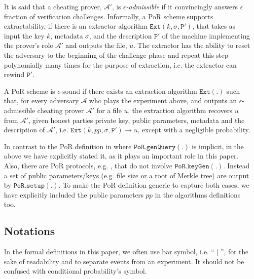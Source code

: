 It is said that a cheating prover, $\mathcal{A}'$, is \emph{$\epsilon$-admissible} if it convincingly answers $\epsilon$ fraction of verification challenges. Informally, a PoR scheme supports extractability, if there is an extractor algorithm $\mathtt{Ext}(k,\sigma, \mathtt{P}')$, that takes as input the key $k$, metadata $\sigma$, and the description $\mathtt{P}'$ of the  machine implementing the prover's role $\mathcal{A}'$ and outputs the file, $u$. The extractor has the ability to reset the adversary to the beginning of the challenge phase and repeat this step polynomially many times for the purpose of extraction, i.e. the extractor can rewind $\mathtt{P}'$.




\begin{definition}\label{extractable} A PoR scheme is $\epsilon$-sound if   there exists an extraction algorithm $\mathtt{Ext}(.)$ such that, for every adversary $\mathcal{A}$ who plays the experiment above, and outputs an $\epsilon$-admissible cheating prover $\mathcal{A}'$ for a file $u$,  the extraction algorithm  recovers $u$ from $\mathcal{A}'$, given honest parties private key, public parameters, metadata and the description of $\mathcal{A}'$,  i.e. $\mathtt{Ext}(k,{ pp},\sigma, \mathtt{P}')\rightarrow u$, except with a negligible probability. 
\end{definition}








In contrast to the PoR definition in \cite{DBLP:journals/iacr/JuelsK07,DBLP:conf/asiacrypt/ShachamW08} where $\mathtt{PoR.genQuery}(.)$ is implicit, in the above we have explicitly stated  it, as it    plays an important role in this paper. Also, there are PoR protocols, e.g. \cite{MillerPermacoin}, that do not involve $\mathtt{PoR.keyGen}(.)$. Instead a set of public parameters/keys (e.g. file size or a root of Merkle tree) are output by $\mathtt{PoR.setup}(.)$. To make the PoR definition generic to capture both cases, we have explicitly included the public parameters $pp$ in the algorithms definitions too.  

\subsection{Notations} In the formal definitions in this paper, we often use bar symbol, i.e. `` $|$ '', for the sake of readability and to separate events from an experiment. It should not be confused with conditional probability's symbol. 



